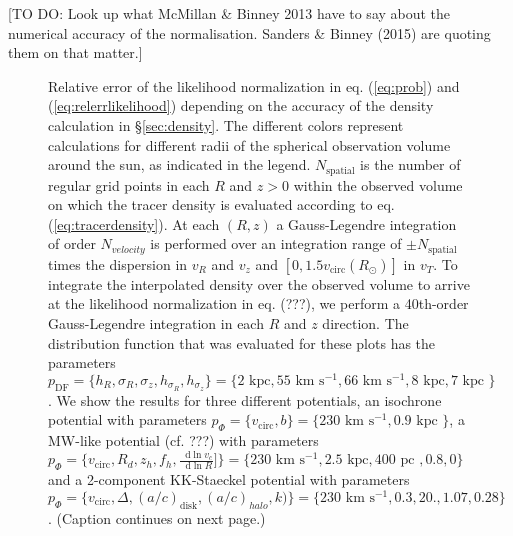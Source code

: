 \documentclass[12pt,preprint]{aastex}
\newcommand*\diff{\mathop{}\!\mathrm{d}}
\begin{document}
[TO DO: Look up what McMillan \& Binney 2013 have to say about the numerical accuracy of the normalisation. Sanders \& Binney (2015) are quoting them on that matter.]



\begin{figure}
\caption{Relative error of the likelihood normalization in eq. (\ref{eq:prob}) and (\ref{eq:relerrlikelihood}) depending on the accuracy of the density calculation in \S\ref{sec:density}. The different colors represent calculations for different radii of the spherical observation volume around the sun, as indicated in the legend. $N_\text{spatial}$ is the number of regular grid points in each $R$ and $z > 0$ within the observed volume on which the tracer density is evaluated according to eq. (\ref{eq:tracerdensity}). At each $(R,z)$ a Gauss-Legendre integration of order $N_{velocity}$ is performed over an integration range of $\pm N_\text{spatial}$ times the dispersion in $v_R$ and $v_z$ and $[0,1.5v_\text{circ}(R_\odot)]$ in $v_T$. To integrate the interpolated density over the observed volume to arrive at the likelihood normalization in eq. (???), we perform a 40th-order Gauss-Legendre integration in each $R$ and $z$ direction. The distribution function that was evaluated for these plots has the parameters $p_\text{DF} = \{ h_R, \sigma_R, \sigma_z,h_{\sigma_R},h_{\sigma_z}\} =\{2 \text{ kpc}, 55 \text{ km s$^{-1}$}, 66 \text{ km s$^{-1}$}, 8 \text{ kpc}, 7 \text{ kpc }\} $. We show the results for three different potentials, an isochrone potential with parameters $p_\Phi = \{v_\text{circ},b \}=\{230 \text{ km s$^{-1}$},0.9\text{ kpc } \}$, a MW-like potential (cf. ???) with parameters $p_\Phi = \{v_\text{circ},R_d,z_h,f_h,\frac{\diff\ln v_c}{\diff\ln R}] \}=\{230 \text{ km s$^{-1}$},2.5\text{ kpc},400 \text{ pc }, 0.8,0\}$ and a 2-component KK-Staeckel potential with parameters $p_\Phi = \{v_\text{circ}, \Delta, (a/c)_\text{disk},(a/c)_{halo},k)\} = \{230\text{ km s$^{-1}$},0.3,20.,1.07, 0.28\}$. (Caption continues on next page.)} 
\label{fig:norm_accuracy}
\end{figure}
\end{document}
